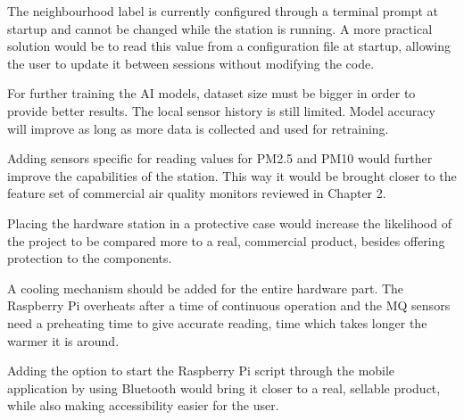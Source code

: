 The neighbourhood label is currently configured through a terminal prompt at startup and cannot
be changed while the station is running. A more practical solution would be to read this value
from a configuration file at startup, allowing the user to update it between sessions without
modifying the code.

For further training the AI models, dataset size must be bigger in order to provide better
results. The local sensor history is still limited. Model accuracy will improve as long as more
data is collected and used for retraining.

Adding sensors specific for reading values for PM2.5 and PM10 would further improve the
capabilities of the station. This way it would be brought closer to the feature set of
commercial air quality monitors reviewed in Chapter 2.

Placing the hardware station in a protective case would increase the likelihood of the project
to be compared more to a real, commercial product, besides offering protection to the
components.

A cooling mechanism should be added for the entire hardware part. The Raspberry Pi overheats
after a time of continuous operation and the MQ sensors need a preheating time to give accurate
reading, time which takes longer the warmer it is around.

Adding the option to start the Raspberry Pi script through the mobile application by using
Bluetooth would bring it closer to a real, sellable product, while also making accessibility
easier for the user.
